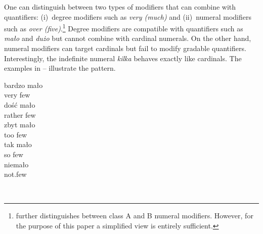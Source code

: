 \documentclass[output=paper,
]{langscibook}
\begin{document}
	One can distinguish between two types of modifiers that can combine with quantifiers: (i)~degree modifiers such as \textit{very (much)} and (ii)~numeral modifiers such as \textit{over (five)}.\footnote{\cite{nouwen2010two} further distinguishes between class A and B numeral modifiers. However, for the purpose of this paper a simplified view is entirely sufficient.} Degree modifiers are compatible with quantifiers such as \textit{mało} and \textit{dużo} but cannot combine with cardinal numerals. On the other hand, numeral modifiers can target cardinals but fail to modify gradable quantifiers. Interestingly, the indefinite numeral \textit{kilka} behaves exactly like cardinals. The examples in -- illustrate the pattern. 
	\vspace{2cm}
	\begin{multicols}{2}
	
		\ea \label{ex:degree-modifiers-malo} \ea \gll bardzo mało\\
		very few\\
		\ex \gll dość mało\\
		rather few\\
		\ex \gll zbyt mało\\
		too few\\
		\ex \gll tak mało\\
		so few\\
		\ex \gll niemało\\
		not.few\\
		\z
        \z
		\ea \label{ex:numeral-modifiers-malo} 
		\z
        \z

        \textcolor{white}{.}
        \newline
        \textcolor{white}{.}
        \newline
        \textcolor{white}{.}
        \newline


\end{multicols}
\end{document}
